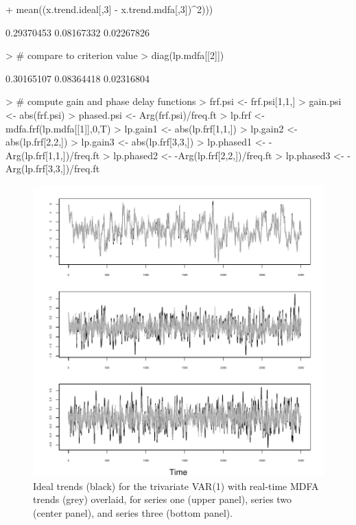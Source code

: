 \documentclass[a4paper]{book}
\begin{document}
\begin{Schunk}
\begin{Sinput}
+ 	mean((x.trend.ideal[,3] - x.trend.mdfa[,3])^2)))
\end{Sinput}
\begin{Soutput}
[1] 0.29370453 0.08167332 0.02267826
\end{Soutput}
\begin{Sinput}
> # compare to criterion value
> diag(lp.mdfa[[2]])
\end{Sinput}
\begin{Soutput}
[1] 0.30165107 0.08364418 0.02316804
\end{Soutput}
\begin{Sinput}
> # compute gain and phase delay functions
> frf.psi <- frf.psi[1,1,]
> gain.psi <- abs(frf.psi)
> phased.psi <- Arg(frf.psi)/freq.ft
> lp.frf <- mdfa.frf(lp.mdfa[[1]],0,T)
> lp.gain1 <- abs(lp.frf[1,1,])
> lp.gain2 <- abs(lp.frf[2,2,])
> lp.gain3 <- abs(lp.frf[3,3,])
> lp.phased1 <- -Arg(lp.frf[1,1,])/freq.ft
> lp.phased2 <- -Arg(lp.frf[2,2,])/freq.ft
> lp.phased3 <- -Arg(lp.frf[3,3,])/freq.ft
\end{Sinput}
\end{Schunk}


\begin{figure}[htb!]
\begin{center}
\includegraphics[]{mdfa_trivar1_filtering.pdf}
\caption{Ideal trends (black) for the trivariate VAR(1)
	with real-time MDFA trends (grey) overlaid, for series one (upper panel),
	series two (center panel), and series three (bottom panel).}
\label{fig:trivar1.trends} 
\end{center}
\end{figure}
\end{document}
